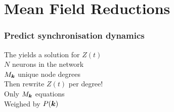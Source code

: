 \section{Mean Field Reductions}
\begin{frame}
\frametitle{Predict synchronisation dynamics} 
The \MFR yields a solution for $Z(t)$\\
\tabitem $N$ neurons in the network \\
\tabitem $M_{{\boldsymbol{k}}}$ unique node degrees \\[0.5cm]

Then rewrite $Z(t)$ per degree!\\
\tabitem Only $M_{{\boldsymbol{k}}}$ equations \\
\tabitem Weighed by $P({\boldsymbol{k}})$ \\
\end{frame}


